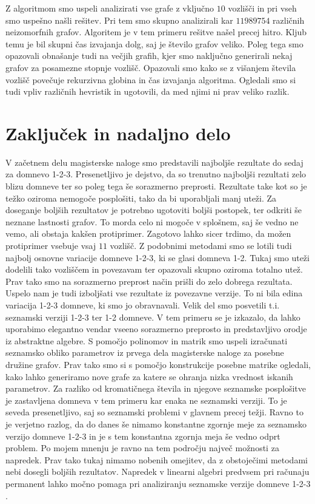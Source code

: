 \documentclass[12pt,a4paper,twoside]{article}
\theoremstyle{definition} %
\theoremstyle{plain} %
\numberwithin{equation}{section}  %
\begin{document}
Z algoritmom smo uspeli analizirati vse grafe z vključno $10$ vozlišči in pri vseh smo uspešno našli rešitev. Pri tem smo skupno analizirali kar $11989754$ različnih neizomorfnih grafov. Algoritem je v tem primeru rešitve našel precej hitro. Kljub temu je bil skupni čas izvajanja dolg, saj je število grafov veliko. Poleg tega smo opazovali obnašanje tudi na večjih grafih, kjer smo naključno generirali nekaj grafov za posamezne stopnje vozlišč. Opazovali smo kako se z višanjem števila vozlišč povečuje rekurzivna globina in čas izvajanja algoritma. Ogledali smo si tudi vpliv različnih hevristik in ugotovili, da med njimi ni prav veliko razlik. 

\section{Zaključek in nadaljno delo}

V začetnem delu magisterske naloge smo predstavili najboljše rezultate do sedaj za domnevo 1-2-3. Presenetljivo je dejstvo, da so trenutno najboljši rezultati zelo blizu domneve ter so poleg tega še sorazmerno preprosti. Rezultate take kot so je težko oziroma nemogoče posplošiti, tako da bi uporabljali manj uteži. Za doseganje boljših rezultatov je potrebno ugotoviti boljši postopek, ter odkriti še neznane lastnosti grafov. To morda celo ni mogoče v splošnem, saj še vedno ne vemo, ali obstaja kakšen protiprimer. Zagotovo lahko sicer trdimo, da možen protiprimer vsebuje vsaj $11$ vozlišč. Z podobnimi metodami smo se lotili tudi najbolj osnovne variacije domneve 1-2-3, ki se glasi domneva 1-2. Tukaj smo uteži dodelili tako vozliščem in povezavam ter opazovali skupno oziroma totalno utež. Prav tako smo na sorazmerno preprost način prišli do zelo dobrega rezultata. Uspelo nam je tudi izboljšati vse rezultate iz povezavne verzije. To ni bila edina variacija 1-2-3 domneve, ki smo jo obravnavali. Velik del smo posvetili t.i. seznamski verziji 1-2-3 ter 1-2 domneve. V tem primeru se je izkazalo, da lahko uporabimo elegantno vendar vseeno sorazmerno preprosto in predstavljivo orodje iz abstraktne algebre. S pomočjo polinomov in matrik smo uspeli izračunati seznamsko obliko parametrov iz prvega dela magisterske naloge za posebne družine grafov. Prav tako smo si s pomočjo konstrukcije posebne matrike ogledali, kako lahko generiramo nove grafe za katere se ohranja nizka vrednost iskanih parametrov. Za razliko od kromatičnega števila in njegove seznamske posplošitve je zastavljena domneva v tem primeru kar enaka ne seznamski verziji. To je seveda presenetljivo, saj so seznamski problemi v glavnem precej težji. Ravno to je verjetno razlog, da do danes še nimamo konstantne zgornje meje za seznamsko verzijo domneve 1-2-3 in je s tem konstantna zgornja meja še vedno odprt problem. Po mojem mnenju je ravno na tem področju največ možnosti za napredek. Prav tako tukaj nimamo nobenih omejitev, da z obstoječimi metodami nebi dosegli boljših rezultatov. Napredek v linearni algebri predvsem pri računaju permanent lahko močno pomaga pri analiziranju seznamske verzije domneve 1-2-3 .
\end{document}
